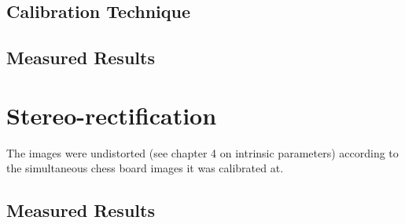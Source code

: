 \subsection{Calibration Technique}

\subsection{Measured Results}

\section{Stereo-rectification}

The images were undistorted (see chapter 4 on intrinsic parameters) according to the simultaneous chess board images it was calibrated at.

\subsection{Measured Results}